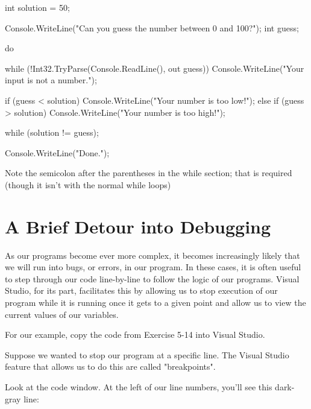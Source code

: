 \documentclass[oneside, openany] {book}
\begin{document}
\begin{CSharp}
int solution = 50;

Console.WriteLine("Can you guess the number between 0 and 100?");
int guess;

do
{
    while (!Int32.TryParse(Console.ReadLine(), out guess))
    {
        Console.WriteLine("Your input is not a number.");
    }
    
    if (guess < solution)
    {
        Console.WriteLine("Your number is too low!");
    }
    else if (guess > solution)
    {
        Console.WriteLine("Your number is too high!");
    }
}
while (solution != guess);
             
Console.WriteLine("Done.");



\end{CSharp}
Note the semicolon after the parentheses in the while section; that is required (though it isn't with the normal while loops) 
\section{A Brief Detour into Debugging}
As our programs become ever more complex, it becomes increasingly likely that we will run into bugs, or errors, in our program. In these cases, it is often useful to step through our code line-by-line to follow the logic of our programs. Visual Studio, for its part, facilitates this by allowing us to stop execution of our program while it is running once it gets to a given point and allow us to view the current values of our variables.

For our example, copy the code from Exercise 5-14 into Visual Studio.

Suppose we wanted to stop our program at a specific line. The Visual Studio feature that allows us to do this are called "breakpoints".

Look at the code window. At the left of our line numbers, you'll see this dark-gray line:
\end{document}
